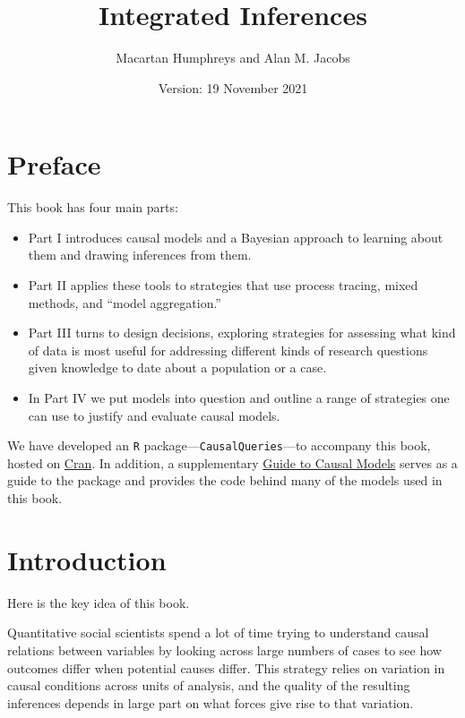 \documentclass[
  12pt,
]{book}
\title{Integrated Inferences}
\author{Macartan Humphreys and Alan M. Jacobs}
\date{Version: 19 November 2021}
\begin{document}
\maketitle

{
\setcounter{tocdepth}{1}
\tableofcontents
}
\hypertarget{preface}{%
\chapter*{Preface}\label{preface}}

This book has four main parts:

\begin{itemize}
\item
  Part I introduces causal models and a Bayesian approach to learning about them and drawing inferences from them.
\item
  Part II applies these tools to strategies that use process tracing, mixed methods, and ``model aggregation.''
\item
  Part III turns to design decisions, exploring strategies for assessing what kind of data is most useful for addressing different kinds of research questions given knowledge to date about a population or a case.
\item
  In Part IV we put models into question and outline a range of strategies one can use to justify and evaluate causal models.
\end{itemize}

We have developed an \texttt{R} package---\texttt{CausalQueries}---to accompany this book, hosted on \href{https://cran.r-project.org/web/packages/CausalQueries/index.html}{Cran}. In addition, a supplementary \href{https://macartan.github.io/causalmodels/}{Guide to Causal Models} serves as a guide to the package and provides the code behind many of the models used in this book.

\hypertarget{intro}{%
\chapter{Introduction}\label{intro}}

Here is the key idea of this book.

Quantitative social scientists spend a lot of time trying to understand causal relations between variables by looking across large numbers of cases to see how outcomes differ when potential causes differ. This strategy relies on variation in causal conditions across units of analysis, and the quality of the resulting inferences depends in large part on what forces give rise to that variation.
\end{document}
